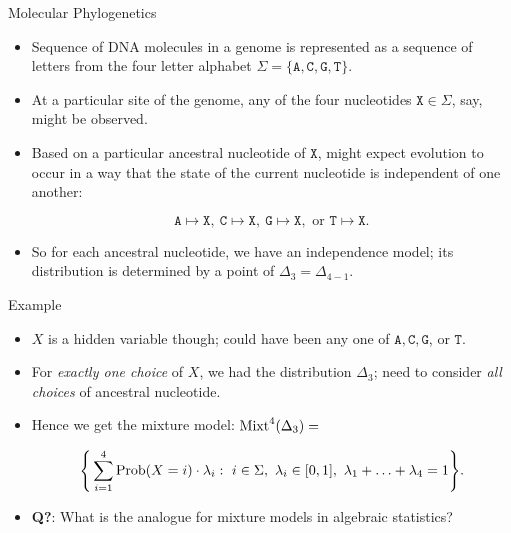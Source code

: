 \begin{frame}{Molecular Phylogenetics}

    \begin{itemize}
        \item Sequence of DNA molecules in a genome is represented as a sequence of letters from the four letter alphabet $\Sigma = \{ \texttt{A}, \texttt{C}, \texttt{G}, \texttt{T} \}$.

        \item At a particular site of the genome, any of the four nucleotides $\texttt{X} \in \Sigma$, say, might be observed.

        \item Based on a particular ancestral nucleotide of $\texttt{X}$, might expect evolution to occur in a way that the state of the current nucleotide is independent of one another:

        $$ \texttt{A} \mapsto \texttt{X},\ \texttt{C} \mapsto \texttt{X},\ \texttt{G} \mapsto \texttt{X}, \text{ or } \texttt{T} \mapsto \texttt{X}. $$

        \item So for each ancestral nucleotide, we have an independence model; its distribution is determined by a point of $\Delta_{3} = \Delta_{4-1}$.

    \end{itemize}

\end{frame}

\begin{frame}{Example}
    \begin{itemize}
        \item  $X$ is a hidden variable though; could have been any one of $\texttt{A}, \texttt{C}, \texttt{G}$, or $\texttt{T}$.

        \item For \emph{exactly one choice} of $X$, we had the distribution $\Delta_{3}$; need to consider \emph{all choices} of ancestral nucleotide.

        \item Hence we get the mixture model: $\operatorname{Mixt}^{4}(\Delta_{3}) =$

        $$\Bigg\{ \sum_{i = 1}^{4} \Prob(X = i)\cdot \lambda_{i}  :\ i \in \Sigma,\ \lambda_{i} \in [0,1],\ \lambda_{1} + \ldots + \lambda_{4} = 1 \Bigg\}. $$

        \item \textbf{Q?}: What is the analogue for mixture models in algebraic statistics?
    \end{itemize}
\end{frame}

